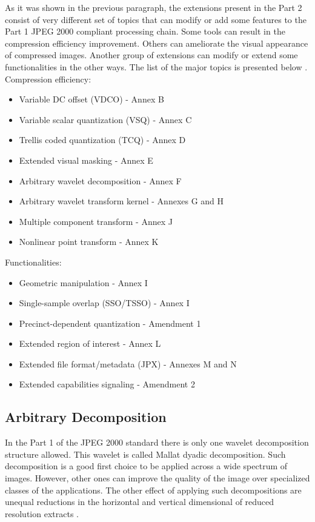 As it was shown in the previous paragraph, the extensions present in the Part 2 consist of 
very different set of topics that can modify or add some features to the Part 1 JPEG 2000 compliant 
processing chain. Some tools can result in the compression efficiency improvement. Others can
ameliorate the visual appearance of compressed images. Another group of extensions can modify
or extend some functionalities in the other ways. The list of the major topics is presented below \cite{jpeg_suite}.
\newline \newline Compression efficiency:
\begin{itemize}
    \item Variable DC offset (VDCO) - Annex B
    \item Variable scalar quantization (VSQ) - Annex C
    \item Trellis coded quantization (TCQ) - Annex D
    \item Extended visual masking - Annex E
    \item Arbitrary wavelet decomposition - Annex F
    \item Arbitrary wavelet transform kernel - Annexes G and H
    \item Multiple component transform - Annex J
    \item Nonlinear point transform - Annex K \cite{jpeg_suite}
\end{itemize}
\hfill \break Functionalities:
\begin{itemize} 
    \item Geometric manipulation - Annex I
    \item Single-sample overlap (SSO/TSSO) - Annex I
    \item Precinct-dependent quantization - Amendment 1
    \item Extended region of interest - Annex L
    \item Extended file format/metadata (JPX) - Annexes M and N
    \item Extended capabilities signaling - Amendment 2 \cite{jpeg_suite}
\end{itemize}

\subsection{Arbitrary Decomposition} \label{sec:arbitrary_decomposition}

In the Part 1 of the JPEG 2000 standard there is only one wavelet decomposition structure allowed.
This wavelet is called Mallat dyadic decomposition. Such decomposition is a good first choice
to be applied across a wide spectrum of images. However, other ones can improve the quality of the image
over specialized classes of the applications. The other effect of applying such decompositions are
unequal reductions in the horizontal and vertical dimensional of reduced resolution extracts \cite{jpeg_suite}.

